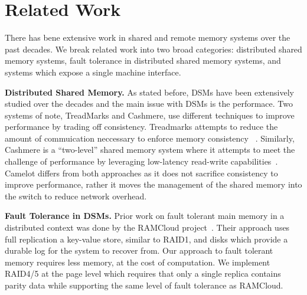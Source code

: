 \section{Related Work}
\label{sec:related}

There has bene extensive work in shared and remote memory systems over the past
decades. We break related work into two broad categories: distributed shared
memory systems, fault tolerance in distributed shared memory systems, and
systems which expose a single machine interface.

\textbf{Distributed Shared Memory.} As stated before, DSMs have been extensively
studied over the decades and the main issue with DSMs is the performace. Two
systems of note, TreadMarks and Cashmere, use different techniques to improve
performance by trading off consistency. Treadmarks attempts to reduce
the amount of commuication neccessary to enforce memory consistency~
\cite{Keleher1994}. Similarly, Cashmere is a ``two-level'' shared memory system
where it attempts to meet the challenge of performance by leveraging low-latency
read-write capabilities~\cite{cashmere}. Camelot differs from both approaches as
it does not sacrifice consistency to improve performance, rather it moves the
management of the shared memory into the switch to reduce network overhead.


\textbf{Fault Tolerance in DSMs.} Prior work on fault tolerant main memory in a
distributed context was done by the RAMCloud project~\cite{Ousterhout:2015:RSS:2818727.2806887}. 
Their approach uses full replication a key-value store, similar to RAID1, and
disks which provide a durable log for the system to recover from.  Our approach
to fault tolerant memory requires less memory, at the cost of computation. We
implement RAID4/5 at the page level which requires that only a single replica
contains parity data while supporting the same level of fault tolerance as
RAMCloud.


